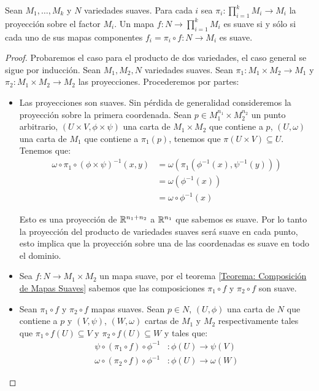 \begin{theorem}\label{Teorema: Mapa a Producto de Variedades Suaves}
	Sean $M_1,\dots,M_k$ y $N$ variedades suaves. Para cada $i$ sea $\pi_i: \prod_{i=1}^{k} M_i \to M_i$ la proyección sobre el factor $M_i$. Un mapa $f: N \to \prod_{i=1}^{k} M_i$ es suave si y sólo si cada uno de sus mapas componentes $f_i = \pi_i \circ f: N \to M_i$ es suave.
\end{theorem}

\begin{proof}
	Probaremos el caso para el producto de dos variedades, el caso general se sigue por inducción. Sean $M_1, M_2, N$ variedades suaves. Sean $\pi_1: M_1 \times M_2 \to M_1$ y $\pi_2: M_1 \times M_2 \to M_2$ las proyecciones. Procederemos por partes:

	\begin{itemize}
		\item Las proyecciones son suaves. Sin pérdida de generalidad consideremos la proyección sobre la primera coordenada.
		      Sean $p \in M_1^{n_1} \times M_2^{n_2}$ un punto arbitrario, $(U \times V,\phi \times \psi)$ una carta de $M_1 \times M_2$ que contiene a $p$, $(U, \omega)$ una carta de $M_1$ que contiene a $\pi_1(p)$, tenemos que $\pi(U \times V) \subseteq U$. Tenemos que:
		      \begin{align*}
			      \omega \circ \pi_1 \circ (\phi \times \psi)^{-1}(x,y) & =  \omega(\pi_1 (\phi^{-1}(x), \psi^{-1}(y))) \\
			                                                            & = \omega(\phi^{-1}(x))                        \\
			                                                            & = \omega \circ \phi^{-1}(x)
		      \end{align*}

		      Esto es una proyección de $\mathbb{R}^{n_1 + n_2}$ a $\mathbb{R}^{n_1}$ que sabemos es suave. Por lo tanto la proyección del producto de variedades suaves será suave en cada punto, esto implica que la proyección sobre una de las coordenadas es suave en todo el dominio.

		\item Sea $f: N \to M_1 \times M_2$ un mapa suave, por el teorema \ref{Teorema: Composición de Mapas Suaves} sabemos que las composiciones $\pi_1 \circ f$ y $\pi_2 \circ f$ son suave.

		\item Sean $\pi_1 \circ f$ y $\pi_2 \circ f$ mapas suaves. Sean $p \in N$, $(U,\phi)$ una carta de $N$ que contiene a $p$ y $(V,\psi)$, $(W,\omega)$ cartas de $M_1$ y $M_2$ respectivamente tales que $\pi_1 \circ f (U) \subseteq V$ y $\pi_2 \circ f(U) \subseteq W$ y tales que:
		      \begin{align*}
			      \psi \circ (\pi_1 \circ f) \circ \phi^{-1}   & : \phi(U) \to \psi(V)   \\
			      \omega \circ (\pi_2 \circ f) \circ \phi^{-1} & : \phi(U) \to \omega(W)
		      \end{align*}


\end{itemize}
\end{proof}
